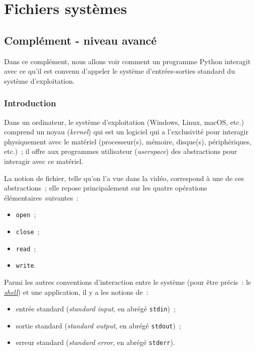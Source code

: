     
    
    
    

    

    \hypertarget{fichiers-systuxe8mes}{%
\section{Fichiers systèmes}\label{fichiers-systuxe8mes}}

    \hypertarget{compluxe9ment---niveau-avancuxe9}{%
\subsection{Complément - niveau
avancé}\label{compluxe9ment---niveau-avancuxe9}}

    Dans ce complément, nous allons voir comment un programme Python
interagit avec ce qu'il est convenu d'appeler le système
d'entrées-sorties standard du système d'exploitation.

    \hypertarget{introduction}{%
\subsubsection{Introduction}\label{introduction}}

    Dans un ordinateur, le système d'exploitation (Windows, Linux, macOS,
etc.) comprend un noyau (\emph{kernel}) qui est un logiciel qui a
l'exclusivité pour interagir physiquement avec le matériel
(processeur(s), mémoire, disque(s), périphériques, etc.)~; il offre aux
programmes utilisateur (\emph{userspace}) des abstractions pour
interagir avec ce matériel.

La notion de fichier, telle qu'on l'a vue dans la vidéo, correspond à
une de ces abstractions~; elle repose principalement sur les quatre
opérations élémentaires~suivantes~:

\begin{itemize}
\tightlist
\item
  \texttt{open}~;
\item
  \texttt{close}~;
\item
  \texttt{read}~;
\item
  \texttt{write}.
\end{itemize}

    Parmi les autres conventions d'interaction entre le système (pour être
précis~: le
\href{http://fr.wikipedia.org/wiki/Interface_système}{\emph{shell}}) et
une application, il y a les notions de~:

\begin{itemize}
\tightlist
\item
  entrée standard (\emph{standard input}, en abrégé \texttt{stdin})~;
\item
  sortie standard (\emph{standard output}, en abrégé \texttt{stdout})~;
\item
  erreur standard (\emph{standard error}, en abrégé \texttt{stderr}).
\end{itemize}

